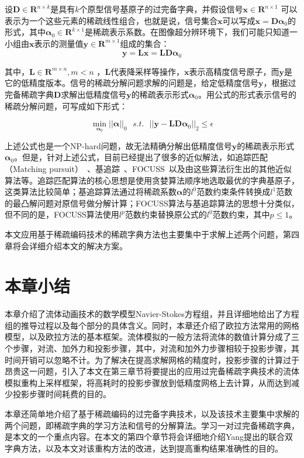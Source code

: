 设${\boldsymbol D} \in {\boldsymbol R}^{n \times k}$是具有$k$个原型信号基原子的过完备字典，并假设信号\({\boldsymbol x}  \in {\boldsymbol R}^{n \times 1}\) 可以表示为一个这些元素的稀疏线性组合，也就是说，信号集合\({\boldsymbol x}\)可以写成${\boldsymbol x} = {\boldsymbol D} \boldsymbol \alpha_0$的形式，其中$\boldsymbol \alpha_0 \in  {\boldsymbol R}^{k \times 1}$是稀疏表示系数。在图像超分辨环境下，我们可能只知道一小组由${\boldsymbol x}$表示的测量值${\boldsymbol y \in \boldsymbol R^{m \times 1}}$组成的集合：
\begin{equation}
\label{eq:linear}
\boldsymbol y = \boldsymbol L \boldsymbol x =\boldsymbol L \boldsymbol {D\alpha}_0
\end{equation}

其中，$\boldsymbol L \in {\boldsymbol R}^{m \times n}, m < n$ ，$\boldsymbol L$代表降采样等操作，$\boldsymbol x$表示高精度信号原子，而$\boldsymbol y$是它的低精度版本。信号的稀疏分解问题求解的问题是，给定低精度信号$\boldsymbol y$，根据过完备稀疏字典$ {\boldsymbol D}$求解出低精度信号$\boldsymbol y$的稀疏表示形式$\boldsymbol \alpha_0$。用公式的形式表示信号的稀疏分解问题，可写成如下形式：

\begin{equation}
\min_{\boldsymbol  \alpha_0}||\boldsymbol \alpha||_0 \ \ \ s.t. \ \ \ ||\boldsymbol y - \boldsymbol {LD\alpha}_0||_2 \leq \epsilon
\end{equation}

上述公式也是一个NP-hard问题，故无法精确分解出低精度信号$\boldsymbol y$的稀疏表示形式$\boldsymbol \alpha_0$。但是，针对上述公式，目前已经提出了很多的近似解法，如追踪匹配（Matching pursuit）~\cite{mallat1993matching}、基追踪~\cite{chen1998atomic}、FOCUSS~\cite{rao1997deriving}以及由这些算法衍生出的其他近似算法等。追踪匹配算法的核心思想是使用贪婪算法顺序地选取最优的字典基原子，这类算法比较简单；基追踪算法通过将稀疏系数$\boldsymbol \alpha$的$l^0$范数约束条件转换成$l^1$范数的最凸解问题对原信号做分解计算；FOCUSS算法与基追踪算法的思想十分类似，但不同的是，FOCUSS算法使用$l^p$范数约束替换原公式的$l^0$范数约束，其中$p \leq 1$。

本文应用基于稀疏编码技术的稀疏字典方法也主要集中于求解上述两个问题，第四章将会详细介绍本文的解决方案。

\section{本章小结}

本章介绍了流体动画技术的数学模型Navier-Stokes方程组，并且详细地给出了方程组的推导过程以及每个部分的具体含义。同时，本章还介绍了欧拉方法常用的网格模型，以及欧拉方法的基本框架。流体模拟的一般方法将流体的数值计算分成了三个步骤，对流、加外力和投影步骤，其中，对流和加外力步骤相较于投影步骤，其时间开销可以忽略不计。为了解决在提高求解网格的精度时，投影步骤的计算过于昂贵这一问题，引入了本文在第三章节将要提出的应用过完备稀疏字典技术的流体模拟重构上采样框架，将高耗时的投影步骤放到低精度网格上去计算，从而达到减少投影步骤时间耗费的目的。

本章还简单地介绍了基于稀疏编码的过完备字典技术，以及该技术主要集中求解的两个问题，即稀疏字典的学习方法和信号的分解算法。学习一对过完备稀疏字典，是本文的一个重点内容。在本文的第四个章节将会详细地介绍Yang提出的联合双字典方法，以及本文对该重构方法的改进，达到提高重构结果准确性的目的。